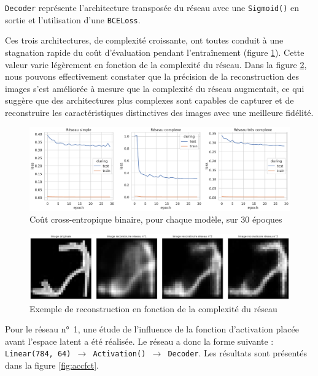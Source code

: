 \documentclass{article}
\begin{document}
\texttt{Decoder} représente l'architecture transposée du réseau avec une \texttt{Sigmoid()} en sortie et l'utilisation d'une \texttt{BCELoss}. 

Ces trois architectures, de complexité croissante, ont toutes conduit à une stagnation rapide du coût d'évaluation pendant l'entraînement (figure \ref{fig:lossencoder}). Cette valeur varie légèrement en fonction de la complexité du réseau. Dans la figure \ref{fig:reconstruction}, nous pouvons effectivement constater que la précision de la reconstruction des images s'est améliorée à mesure que la complexité du réseau augmentait, ce qui suggère que des architectures plus complexes sont capables de capturer et de reconstruire les caractéristiques distinctives des images avec une meilleure fidélité.

\begin{figure}[htbp]
    \centering
    \includegraphics*[width=.85\textwidth]{loss_encoder_fashion_3_networks.pdf}
    \caption{Coût cross-entropique binaire, pour chaque modèle, sur 30 époques}
    \label{fig:lossencoder}
\end{figure}

\begin{figure}[htbp]
    \centering
    \includegraphics*[width=.85\textwidth]{reconstruction_per_network_cplxity.pdf}
    \caption{Exemple de reconstruction en fonction de la complexité du réseau}
    \label{fig:reconstruction}
\end{figure}

Pour le réseau n°~1, une étude de l'influence de la fonction d'activation placée avant l'espace latent a été réalisée. Le réseau a donc la forme suivante : \texttt{Linear(784, 64) $\rightarrow$ Activation() $\rightarrow$ Decoder}. Les résultats sont présentés dans la figure \ref{fig:accfct}. 
\end{document}
